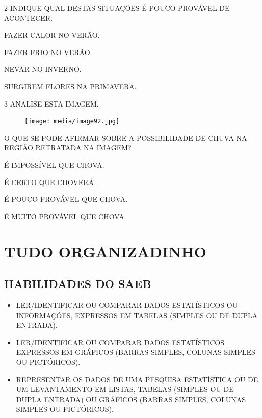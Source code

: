 \num{2} INDIQUE QUAL DESTAS SITUAÇÕES É POUCO PROVÁVEL DE ACONTECER.

\begin{multicols}{2}
\begin{escolha}
\item FAZER CALOR NO VERÃO.

\item FAZER FRIO NO VERÃO.

\item NEVAR NO INVERNO.

\item SURGIREM FLORES NA PRIMAVERA.
\end{escolha}
\end{multicols}

\num{3} ANALISE ESTA IMAGEM.

\begin{figure}[H]
\centering
\texttt{[image: media/image92.jpg]}
\end{figure}

O QUE SE PODE AFIRMAR SOBRE A POSSIBILIDADE DE CHUVA NA REGIÃO RETRATADA NA IMAGEM?

\begin{multicols}{2}
\begin{escolha}
\item É IMPOSSÍVEL QUE CHOVA.

\item É CERTO QUE CHOVERÁ.

\item É POUCO PROVÁVEL QUE CHOVA.

\item É MUITO PROVÁVEL QUE CHOVA.
\end{escolha}
\end{multicols}


\chapter{TUDO ORGANIZADINHO}


\section*{HABILIDADES DO SAEB}

\begin{itemize}
\item \uppercase{Ler/identificar ou comparar dados estatísticos ou informações,
expressos em tabelas (simples ou de dupla entrada).}

\item \uppercase{Ler/identificar ou comparar dados estatísticos expressos em gráficos
(barras simples, colunas simples ou pictóricos).}

\item \uppercase{Representar os dados de uma pesquisa estatística ou de um levantamento
em listas, tabelas (simples ou de dupla entrada) ou gráficos (barras
simples, colunas simples ou pictóricos).}
\end{itemize}

